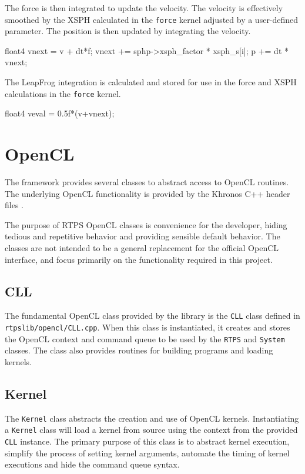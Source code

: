 The force is then integrated to update the velocity. The velocity is
effectively smoothed by the XSPH calculated in the \verb|force| kernel adjusted
by a user-defined parameter. The position is then updated by integrating the
velocity.
\begin{cppcode}{0}
float4 vnext = v + dt*f;
vnext += sphp->xsph_factor * xsph_s[i];
p += dt * vnext;
\end{cppcode}

The LeapFrog integration is calculated and stored for use in the force and XSPH
calculations in the \verb|force| kernel.
\begin{cppcode}{0}
float4 veval = 0.5f*(v+vnext);
\end{cppcode}




\section{OpenCL}

The framework provides several classes to abstract access to OpenCL routines.
The underlying OpenCL functionality is provided by the Khronos C++ header
files \cite{OpenCL}.

The purpose of RTPS OpenCL classes is convenience for the developer, hiding tedious
and repetitive behavior and providing sensible default behavior. The classes
are not intended to be a general replacement for the official OpenCL interface,
and focus primarily on the functionality required in this project.

\subsection{CLL}
The fundamental OpenCL class provided by the library is the \verb|CLL| class
defined in \verb|rtpslib/opencl/CLL.cpp|. When this class is instantiated, it
creates and stores the OpenCL context and command queue to be used by the
\verb|RTPS| and \verb|System| classes. The class also provides routines for
building programs and loading kernels.

\subsection{Kernel}
The \verb|Kernel| class abstracts the creation and use of OpenCL kernels.
Instantiating a \verb|Kernel| class will load a kernel from source using the
context from the provided \verb|CLL| instance. The primary purpose of this
class is to abstract kernel execution, simplify the process of setting
kernel arguments, automate the timing of kernel executions and hide the
command queue syntax.


